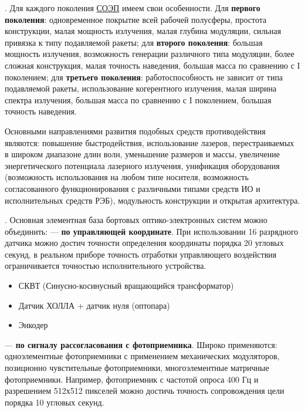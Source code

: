 . Для каждого поколения  \hyperref[acroSOEP]{СОЭП} имеем свои особенности. Для \textbf{первого поколения}: одновременное покрытие всей рабочей полусферы, простота конструкции, малая мощность излучения, малая глубина модуляции, сильная привязка к типу подавляемой ракеты; для \textbf{второго поколения}: большая мощность излучения, возможность генерации различного типа модуляции, более сложная конструкция, малая точность наведения, большая масса по сравнению с I поколением; для \textbf{третьего поколения}: работоспособность не зависит от типа подавляемой ракеты, использование когерентного излучения, малая ширина спектра излучения, большая масса по сравнению с I поколением, большая точность наведения.

Основными направлениями развития подобных средств противодействия являются: повышение быстродействия, использование лазеров, перестраиваемых в широком диапазоне длин волн, уменьшение размеров и массы, увеличение энергетического потенциала лазерного излучения, унификация оборудования (возможность использования на любом типе носителя, возможность согласованного функционирования с различными типами средств ИО и исполнительных средств РЭБ), модульность конструкции и открытая архитектура.

. Основная элементная база бортовых оптико-электронных систем можно объединить:
--- \textbf{по управляющей координате}. При использовании 16 разрядного датчика можно достич точности определения координаты порядка 20 угловых секунд, в реальном приборе точность отработки управляющего воздействия ограничивается точностью исполнительного устройства.
	
	\begin{itemize}
		\item СКВТ (Синусно-косинусный вращающийся трансформатор)
		\item Датчик ХОЛЛА + датчик нуля (оптопара)
		\item Энкодер
	\end{itemize}
		
--- \textbf{по сигналу рассогласования с фотоприемника}. Широко применяются: одноэлементные фотоприемники с применением механических модуляторов, позиционно чувстительные фотоприемники, многоэлементные матричные фотоприемники. Например, фотоприемник с частотой опроса 400 Гц и разрешением 512х512 пикселей можно достичь точность сопровождения цели порядка 10 угловых секунд.

